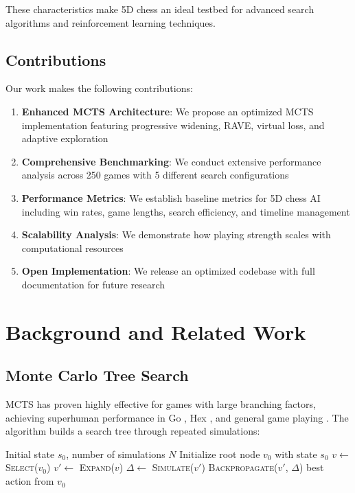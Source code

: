 \documentclass[11pt,a4paper]{article}
\begin{document}
These characteristics make 5D chess an ideal testbed for advanced search algorithms and reinforcement learning techniques.

\subsection{Contributions}

Our work makes the following contributions:

\begin{enumerate}
    \item \textbf{Enhanced MCTS Architecture}: We propose an optimized MCTS implementation featuring progressive widening, RAVE, virtual loss, and adaptive exploration
    \item \textbf{Comprehensive Benchmarking}: We conduct extensive performance analysis across 250 games with 5 different search configurations
    \item \textbf{Performance Metrics}: We establish baseline metrics for 5D chess AI including win rates, game lengths, search efficiency, and timeline management
    \item \textbf{Scalability Analysis}: We demonstrate how playing strength scales with computational resources
    \item \textbf{Open Implementation}: We release an optimized codebase with full documentation for future research
\end{enumerate}

\section{Background and Related Work}

\subsection{Monte Carlo Tree Search}

MCTS has proven highly effective for games with large branching factors, achieving superhuman performance in Go \cite{silver2016mastering}, Hex \cite{browne2012survey}, and general game playing \cite{genesereth2005general}. The algorithm builds a search tree through repeated simulations:

\begin{algorithm}[H]
\caption{Standard MCTS Algorithm}
\begin{algorithmic}[1]
\REQUIRE Initial state $s_0$, number of simulations $N$
\STATE Initialize root node $v_0$ with state $s_0$
    \STATE $v \leftarrow$ \textsc{Select}($v_0$) 
    \STATE $v' \leftarrow$ \textsc{Expand}($v$) 
    \STATE $\Delta \leftarrow$ \textsc{Simulate}($v'$) 
    \STATE \textsc{Backpropagate}($v'$, $\Delta$) 
\ENDFOR
\RETURN best action from $v_0$
\end{algorithmic}
\end{algorithm}
\end{document}
